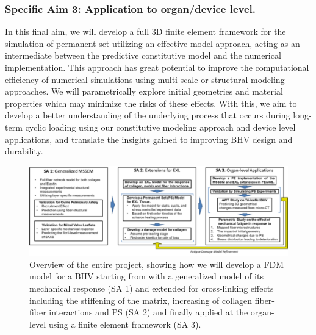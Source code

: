     
    
    \subsubsection*{Specific Aim 3: Application to organ/device level.} In this final aim, we will develop a full 3D finite element framework for the simulation of permanent set utilizing an effective model approach, acting as an intermediate between the predictive constitutive model and the numerical implementation. This approach has great potential to improve the computational efficiency of numerical simulations using multi-scale or structural modeling approaches. We will parametrically explore initial geometries and material properties which may minimize the risks of these effects. With this, we aim to develop a better understanding of the underlying process that occurs during long-term cyclic loading using our constitutive modeling approach and device level applications, and translate the insights gained to improving BHV design and durability. 

    
    
\begin{figure}
\centering
\includegraphics[width=\textwidth]{Images/chapter1/specificaims.pdf}
\caption{Overview of the entire project, showing how we will develop a FDM model for a BHV starting from with a generalized model of its mechanical response (SA 1) and extended for cross-linking effects including the stiffening of the matrix, increasing of collagen fiber-fiber interactions and PS (SA 2) and finally applied at the organ-level using a finite element framework (SA 3).}
\label{c1:fig:specificaims}
\end{figure}
